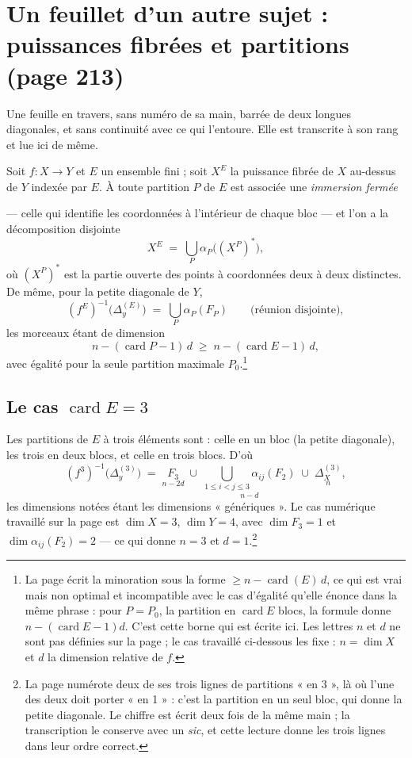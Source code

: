 \documentclass[11pt,a4paper]{article}
\begin{document}
\section*{Un feuillet d'un autre sujet : puissances fibrées et partitions (page 213)}

Une feuille en travers, sans numéro de sa main, barrée de deux longues
diagonales, et sans continuité avec ce qui l'entoure. Elle est transcrite à son
rang et lue ici de même.

Soit $f : X \to Y$ et $E$ un ensemble fini ; soit $X^{E}$ la puissance fibrée
de $X$ au-dessus de $Y$ indexée par $E$. À toute partition $P$ de $E$ est
associée une \emph{immersion fermée}


--- celle qui identifie les coordonnées à l'intérieur de chaque bloc --- et
l'on a la décomposition disjointe
\[
  X^{E} \;=\; \bigcup_{P} \alpha_{P}\bigl((X^{P})^{\ast}\bigr) ,
\]
où $(X^{P})^{\ast}$ est la partie ouverte des points à coordonnées deux à deux
distinctes. De même, pour la petite diagonale de $Y$,
\[
  (f^{E})^{-1}\bigl(\Delta_{y}^{(E)}\bigr) \;=\;
  \bigcup_{P} \alpha_{P}(F_{P}) \qquad \text{(réunion disjointe)} ,
\]
les morceaux étant de dimension
\[
  n - (\operatorname{card} P - 1)\, d \;\geqslant\;
  n - (\operatorname{card} E - 1)\, d ,
\]
avec égalité pour la seule partition maximale
$P_{0}$.\footnote{La page écrit la minoration sous la forme
$\geqslant n - \operatorname{card}(E)\,d$, ce qui est vrai mais non optimal et
incompatible avec le cas d'égalité qu'elle énonce dans la même phrase : pour
$P = P_{0}$, la partition en $\operatorname{card} E$ blocs, la formule donne
$n - (\operatorname{card} E - 1)d$. C'est cette borne qui est écrite ici. Les
lettres $n$ et $d$ ne sont pas définies sur la page ; le cas travaillé
ci-dessous les fixe : $n = \dim X$ et $d$ la dimension relative de $f$.}

\subsection*{Le cas $\operatorname{card} E = 3$}

Les partitions de $E$ à trois éléments sont : celle en un bloc (la petite
diagonale), les trois en deux blocs, et celle en trois blocs. D'où
\[
  (f^{3})^{-1}\bigl(\Delta_{y}^{(3)}\bigr) \;=\;
  \underset{n - 2d}{F_{3}} \;\cup\;
  \underset{n - d}{\bigcup_{1 \leqslant i < j \leqslant 3} \alpha_{ij}(F_{2})}
  \;\cup\; \underset{n}{\Delta_{X}^{(3)}} ,
\]
les dimensions notées étant les dimensions « génériques ». Le cas numérique
travaillé sur la page est $\dim X = 3$, $\dim Y = 4$, avec
$\dim F_{3} = 1$ et $\dim \alpha_{ij}(F_{2}) = 2$ --- ce qui donne $n = 3$ et
$d = 1$.\footnote{La page numérote deux de ses trois lignes de partitions
« en 3 », là où l'une des deux doit porter « en 1 » : c'est la partition en un
seul bloc, qui donne la petite diagonale. Le chiffre est écrit deux fois de la
même main ; la transcription le conserve avec un \emph{sic}, et cette lecture
donne les trois lignes dans leur ordre correct.}
\end{document}
